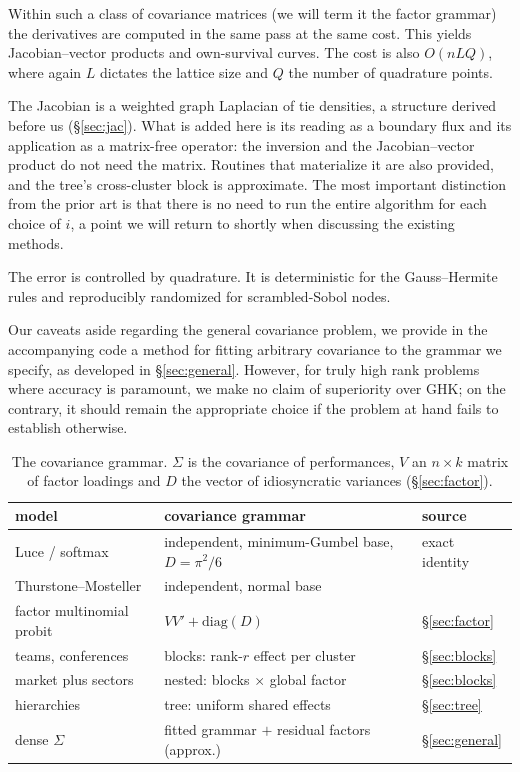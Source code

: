 \documentclass[11pt]{article}
\begin{document}
Within such a class of covariance matrices (we will term it the factor grammar) the derivatives are computed in the same pass at the same cost. This yields Jacobian--vector products and own-survival curves. The cost is also $O(nLQ)$, where again $L$ dictates the lattice size and $Q$ the number of quadrature points.

The Jacobian is a weighted graph Laplacian of tie densities, a structure \citet{muller2022} derived before us (\S\ref{sec:jac}). What is added here is its reading as a boundary flux and its application as a matrix-free operator: the inversion and the Jacobian--vector product do not need the matrix. Routines that materialize it are also provided, and the tree's cross-cluster block is approximate. The most important distinction from the prior art is that there is no need to run the entire algorithm for each choice of $i$, a point we will return to shortly when discussing the existing methods.

The error is controlled by quadrature. It is deterministic for the Gauss--Hermite rules and reproducibly randomized for
scrambled-Sobol nodes.

Our caveats aside regarding the general covariance problem, we provide in the accompanying code a method for fitting arbitrary covariance to the grammar we specify, as developed in \S\ref{sec:general}. However, for truly high rank problems where accuracy is paramount, we make no claim of superiority over GHK; on the contrary, it should remain the appropriate choice if the problem at hand fails to establish otherwise.

\begin{table}[h]\centering\footnotesize
\setlength{\tabcolsep}{4pt}
\begin{tabular}{lll}
\toprule
model & covariance grammar & source \\
\midrule
Luce / softmax & independent, minimum-Gumbel base, $D=\pi^2/6$ & exact identity \\
Thurstone--Mosteller \citep{mosteller1951} & independent, normal base & \citet{cotton2021} \\
factor multinomial probit & $VV'+\mathrm{diag}(D)$ & \S\ref{sec:factor} \\
teams, conferences & blocks: rank-$r$ effect per cluster & \S\ref{sec:blocks} \\
market plus sectors & nested: blocks $\times$ global factor & \S\ref{sec:blocks} \\
hierarchies & tree: uniform shared effects & \S\ref{sec:tree} \\
dense $\Sigma$ & fitted grammar $+$ residual factors (approx.) & \S\ref{sec:general} \\
\bottomrule
\end{tabular}
\caption{The covariance grammar. $\Sigma$ is the covariance of performances, $V$ an $n\times k$ matrix of factor loadings and $D$ the vector of idiosyncratic variances (\S\ref{sec:factor}).}\label{tab:grammar}
\end{table}
\end{document}
